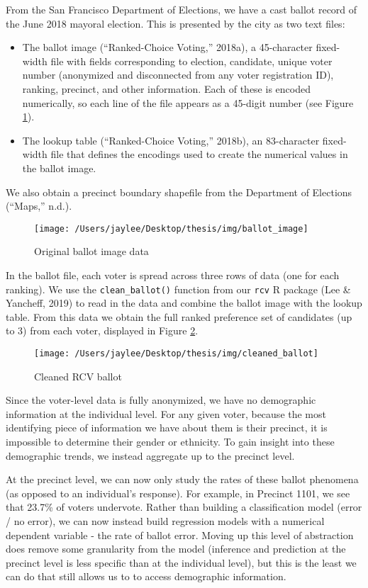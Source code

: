 \documentclass[12pt,twoside]{reedthesis}
\begin{document}
From the San Francisco Department of Elections, we have a cast ballot record of the June 2018 mayoral election. This is presented by the city as two text files:
\begin{itemize}
\item
  The ballot image (``Ranked-Choice Voting,'' 2018a), a 45-character fixed-width file with fields corresponding to election, candidate, unique voter number (anonymized and disconnected from any voter registration ID), ranking, precinct, and other information. Each of these is encoded numerically, so each line of the file appears as a 45-digit number (see Figure \ref{fig:ballot-image}).
\item
  The lookup table (``Ranked-Choice Voting,'' 2018b), an 83-character fixed-width file that defines the encodings used to create the numerical values in the ballot image.
\end{itemize}
We also obtain a precinct boundary shapefile from the Department of Elections (``Maps,'' n.d.).
\begin{figure}

{\centering \texttt{[image: /Users/jaylee/Desktop/thesis/img/ballot\_image]} 

}

\caption{Original ballot image data}\label{fig:ballot-image}
\end{figure}
In the ballot file, each voter is spread across three rows of data (one for each ranking). We use the \texttt{clean\_ballot()} function from our \texttt{rcv} R package (Lee \& Yancheff, 2019) to read in the data and combine the ballot image with the lookup table. From this data we obtain the full ranked preference set of candidates (up to 3) from each voter, displayed in Figure \ref{fig:cleaned-ballot}.
\begin{figure}
\texttt{[image: /Users/jaylee/Desktop/thesis/img/cleaned\_ballot]} \caption{Cleaned RCV ballot}\label{fig:cleaned-ballot}
\end{figure}
Since the voter-level data is fully anonymized, we have no demographic information at the individual level. For any given voter, because the most identifying piece of information we have about them is their precinct, it is impossible to determine their gender or ethnicity. To gain insight into these demographic trends, we instead aggregate up to the precinct level.

At the precinct level, we can now only study the rates of these ballot phenomena (as opposed to an individual's response). For example, in Precinct 1101, we see that 23.7\% of voters undervote. Rather than building a classification model (error / no error), we can now instead build regression models with a numerical dependent variable - the rate of ballot error. Moving up this level of abstraction does remove some granularity from the model (inference and prediction at the precinct level is less specific than at the individual level), but this is the least we can do that still allows us to to access demographic information.
\end{document}
